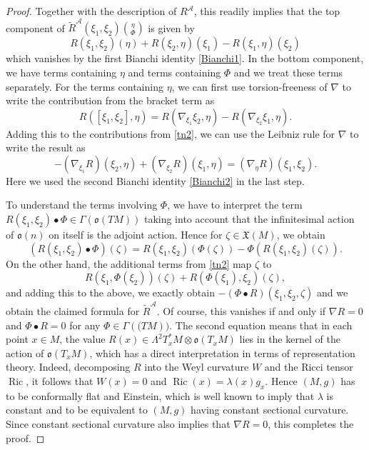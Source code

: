 \documentclass[12pt,a4paper]{amsart}
\def\frak{\mathfrak}
\def\Cal{\mathcal}
\newcommand{\la}{\lambda}
\newcommand{\Ga}{\Gamma}
\newcommand{\La}{\Lambda}
\newcommand{\Ph}{\Phi}
\newcommand{\Ric}{\operatorname{Ric}}
\numberwithin{theorem}{section}
\numberwithin{equation}{section}
\theoremstyle{definition}
\theoremstyle{remark}
\begin{document}
\begin{proof}
  Together with the description of $R^{\Cal A}$, this readily implies that the top
  component of $\widetilde{R}^{\Cal A}(\xi_1,\xi_2)\binom{\eta}{\Phi}$ is given by
  $$
  R(\xi_1,\xi_2)(\eta)+R(\xi_2,\eta)(\xi_1)-R(\xi_1,\eta)(\xi_2)
  $$
  which vanishes by the first Bianchi identity \eqref{Bianchi1}. In the bottom
  component, we have terms containing $\eta$ and terms containing $\Ph$ and we treat
  these terms separately. For the terms containing $\eta$, we can first use
  torsion-freeness of $\nabla$ to write the contribution from the bracket term as
  $$
  R([\xi_1,\xi_2],\eta)=R(\nabla_{\xi_1}\xi_2,\eta)-R(\nabla_{\xi_2}\xi_1,\eta). 
  $$
  Adding this to the contributions from \eqref{tn2}, we can use the Leibniz rule for
  $\nabla$ to write the result as
  $$
  -(\nabla_{\xi_1}R)(\xi_2,\eta)+(\nabla_{\xi_2}R)(\xi_1,\eta)=(\nabla_\eta
  R)(\xi_1,\xi_2). 
  $$
  Here we used the second Bianchi identity \eqref{Bianchi2} in the last step.

  To understand the terms involving $\Phi$, we have to interpret the term
  $R(\xi_1,\xi_2)\bullet\Ph\in\Ga(\frak o(TM))$ taking into account that the
  infinitesimal action of $\frak o(n)$ on itself is the adjoint action. Hence for
  $\zeta\in\frak X(M)$, we obtain
  $$
(R(\xi_1,\xi_2)\bullet\Ph)(\zeta)=R(\xi_1,\xi_2)(\Phi(\zeta))-\Ph(R(\xi_1,\xi_2)(\zeta)). 
  $$
  On the other hand, the additional terms from \eqref{tn2} map $\zeta$ to
  $$
  R(\xi_1,\Ph(\xi_2))(\zeta)+R(\Phi(\xi_1),\xi_2)(\zeta), 
  $$ and adding this to the above, we exactly obtain $-(\Phi\bullet
  R)(\xi_1,\xi_2,\zeta)$ and we obtain the claimed formula for $\widetilde{R}^{\Cal
    A}$. Of course, this vanishes if and only if $\nabla R=0$ and $\Phi\bullet R=0$
  for any $\Phi\in\Ga(\frak (TM))$. The second equation means that in each point
  $x\in M$, the value $R(x)\in\La^2T^*_xM\otimes\frak o(T_xM)$ lies in the kernel of
  the action of $\frak o(T_xM)$, which has a direct interpretation in terms of
  representation theory. Indeed, decomposing $R$ into the Weyl curvature $W$ and the
  Ricci tensor $\Ric$, it follows that $W(x)=0$ and $\Ric(x)=\la(x)g_x$. Hence
  $(M,g)$ has to be conformally flat and Einstein, which is well known to imply that
  $\lambda$ is constant and to be equivalent to $(M,g)$ having constant sectional
  curvature. Since constant sectional curvature also implies that $\nabla R=0$, this
  completes the proof.
\end{proof}
\end{document}
